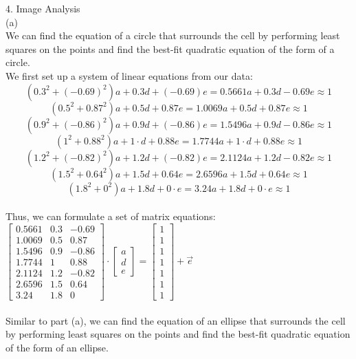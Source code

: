 \documentclass{article}
\begin{document}
{\Large 4. Image Analysis} \\[.5cm]
{\large {\color{red} (a) } }\\

We can find the equation of a circle that surrounds the cell by performing least squares on the points and find the best-fit quadratic equation of the form of a circle. \\

We first set up a system of linear equations from our data:
$$(0.3^2+(-0.69)^2) a + 0.3 d + (-0.69) e =
	0.5661 a + 0.3 d - 0.69 e \approx 1$$
$$(0.5^2+0.87^2) a + 0.5 d + 0.87 e =
	1.0069 a + 0.5 d + 0.87 e \approx 1$$
$$(0.9^2+(-0.86)^2) a + 0.9 d + (-0.86) e =
	1.5496 a + 0.9 d - 0.86 e \approx 1$$
$$(1^2+0.88^2) a + 1\cdot d + 0.88 e =
	1.7744 a + 1\cdot d + 0.88 e \approx 1$$
$$(1.2^2+(-0.82)^2) a + 1.2 d + (-0.82) e =
	2.1124 a + 1.2 d - 0.82 e \approx 1$$
$$(1.5^2+0.64^2) a + 1.5 d + 0.64 e =
	2.6596 a + 1.5 d + 0.64 e \approx 1$$
$$(1.8^2+0^2) a + 1.8 d + 0\cdot e =
	3.24 a + 1.8 d + 0\cdot e \approx 1$$ \\

Thus, we can formulate a set of matrix equations: {\color{red}
$
\begin{bmatrix}
	0.5661 & 0.3 & -0.69 \\
	1.0069 & 0.5 & 0.87 \\
	1.5496 & 0.9 & -0.86 \\
	1.7744 & 1   & 0.88 \\
	2.1124 & 1.2 & -0.82 \\
	2.6596 & 1.5 & 0.64 \\
	3.24   & 1.8 & 0
\end{bmatrix} \cdot
\begin{bmatrix}
	a \\ d \\ e
\end{bmatrix} =
\begin{bmatrix}
	1 \\ 1 \\ 1 \\ 1 \\ 1 \\ 1 \\ 1
\end{bmatrix} + \vec{e}
$} \\[.5cm]

{\large {} } \\

Similar to part (a), we can find the equation of an ellipse that surrounds the cell by performing least squares on the points and find the best-fit quadratic equation of the form of an ellipse. \\
\end{document}
